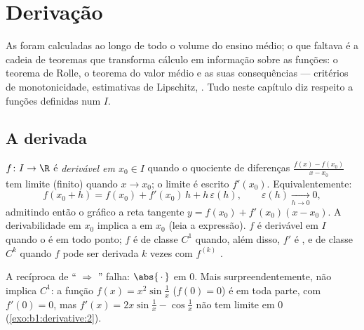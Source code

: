 \chapter{Derivação}\label{ch:b1:derivative}

As  foram calculadas ao longo de todo o volume do ensino
médio; o que faltava é a cadeia de teoremas que transforma cálculo em
informação sobre as funções: o teorema de Rolle, o teorema do valor
médio e as suas consequências --- critérios de monotonicidade,
estimativas de Lipschitz, . Tudo neste capítulo diz respeito
a funções definidas num  $I$.

\section{A derivada}

\begin{definition}\label{def:b1:derivative:def}
$f \colon I \to \R$ é \emph{derivável em $x_0 \in
I$} quando o quociente de diferenças
$\frac{f(x) - f(x_0)}{x - x_0}$ tem limite (finito) quando $x \to x_0$;
o limite é escrito $f'(x_0)$. Equivalentemente:
\[
f(x_0 + h) = f(x_0) + f'(x_0)\,h + h\,\varepsilon(h),
\qquad \varepsilon(h) \xrightarrow[h \to 0]{} 0 ,
\]
admitindo então o gráfico a reta tangente $y = f(x_0) + f'(x_0)(x -
x_0)$. A derivabilidade em $x_0$ implica a  em $x_0$ (leia
a expressão). $f$ é derivável em $I$ quando o é em todo ponto;
$f$ é de classe $C^1$ quando, além disso, $f'$ é , e de
classe $C^k$ quando $f$ pode ser
derivada $k$ vezes com $f^{(k)}$ .
\end{definition}

\begin{example}\label{ex:b1:derivative:notc1}
A recíproca de `` $\Rightarrow$ '' falha:
$\abs{\,\cdot\,}$ em $0$. Mais surpreendentemente,  não
implica $C^1$: a função $f(x) = x^2 \sin\frac 1x$ ($f(0) = 0$) é
 em toda parte, com $f'(0) = 0$, mas $f'(x) = 2x
\sin\frac1x - \cos\frac 1x$ não tem limite em $0$
(\cref{exo:b1:derivative:2}).
\end{example}

